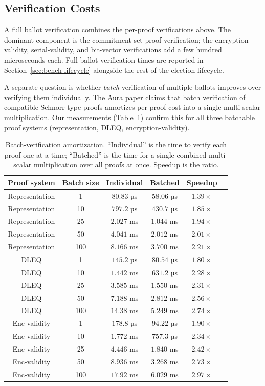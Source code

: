 \documentclass[12pt,a4paper,oneside]{report}
\begin{document}
\subsection{Verification Costs}
\label{sec:bench-verify}

A full ballot verification combines the per-proof verifications above. 
The dominant component is the commitment-set proof verification; the 
encryption-validity, serial-validity, and bit-vector verifications add 
a few hundred microseconds each. Full ballot verification times are 
reported in Section~\ref{sec:bench-lifecycle} alongside the rest of the 
election lifecycle.

A separate question is whether \emph{batch} verification of multiple 
ballots improves over verifying them individually. The Aura paper claims 
that batch verification of compatible Schnorr-type proofs amortizes per-proof 
cost into a single multi-scalar multiplication. Our measurements 
(Table~\ref{tab:bench-batch}) confirm this for all three batchable 
proof systems (representation, DLEQ, encryption-validity).

\begin{table}[H]
\centering
\caption{Batch-verification amortization. ``Individual'' is the time to 
verify each proof one at a time; ``Batched'' is the time for a single 
combined multi-scalar multiplication over all proofs at once. Speedup 
is the ratio.}
\label{tab:bench-batch}
\small
\begin{tabular}{cccccc}
\toprule
Proof system & Batch size & Individual & Batched & Speedup \\
\midrule
Representation & 1   & $80.83$ µs & $58.06$ µs & $1.39\times$ \\
Representation & 10  & $797.2$ µs & $430.7$ µs & $1.85\times$ \\
Representation & 25  & $2.027$ ms & $1.044$ ms & $1.94\times$ \\
Representation & 50  & $4.041$ ms & $2.012$ ms & $2.01\times$ \\
Representation & 100 & $8.166$ ms & $3.700$ ms & $2.21\times$ \\
\midrule
DLEQ           & 1   & $145.2$ µs & $80.54$ µs & $1.80\times$ \\
DLEQ           & 10  & $1.442$ ms & $631.2$ µs & $2.28\times$ \\
DLEQ           & 25  & $3.585$ ms & $1.550$ ms & $2.31\times$ \\
DLEQ           & 50  & $7.188$ ms & $2.812$ ms & $2.56\times$ \\
DLEQ           & 100 & $14.38$ ms & $5.249$ ms & $2.74\times$ \\
\midrule
Enc-validity   & 1   & $178.8$ µs & $94.22$ µs & $1.90\times$ \\
Enc-validity   & 10  & $1.772$ ms & $757.3$ µs & $2.34\times$ \\
Enc-validity   & 25  & $4.446$ ms & $1.840$ ms & $2.42\times$ \\
Enc-validity   & 50  & $8.936$ ms & $3.268$ ms & $2.73\times$ \\
Enc-validity   & 100 & $17.92$ ms & $6.029$ ms & $2.97\times$ \\
\bottomrule
\end{tabular}
\end{table}
\end{document}
